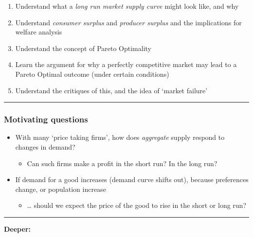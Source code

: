 \documentclass[]{article}
\providecommand{\tightlist}{%
  \setlength{\itemsep}{0pt}\setlength{\parskip}{0pt}}
\begin{document}
\begin{enumerate}
\def\labelenumi{\arabic{enumi}.}
\tightlist
\item
  Understand what a \emph{long run market supply curve} might look like,
  and why
\item
  Understand \emph{consumer surplus} and \emph{producer surplus} and the
  implications for welfare analysis
\item
  Understand the concept of Pareto Optimality
\item
  Learn the argument for why a perfectly competitive market may lead to
  a Pareto Optimal outcome (under certain conditions)
\item
  Understand the critiques of this, and the idea of `market failure'
\end{enumerate}

\begin{center}\rule{0.5\linewidth}{\linethickness}\end{center}

\hypertarget{motivating-questions}{%
\subsubsection{Motivating questions}\label{motivating-questions}}

\begin{itemize}
\tightlist
\item
  With many `price taking firms', how does \emph{aggregate} supply
  respond to changes in demand?

  \begin{itemize}
  \tightlist
  \item
    Can such firms make a profit in the short run? In the long run?
  \end{itemize}
\item
  If demand for a good increases (demand curve shifts out), because
  preferences change, or population increase

  \begin{itemize}
  \tightlist
  \item
    \ldots{} should we expect the price of the good to rise in the short
    or long run?
  \end{itemize}
\end{itemize}

\begin{center}\rule{0.5\linewidth}{\linethickness}\end{center}

\textbf{Deeper:}
\end{document}
